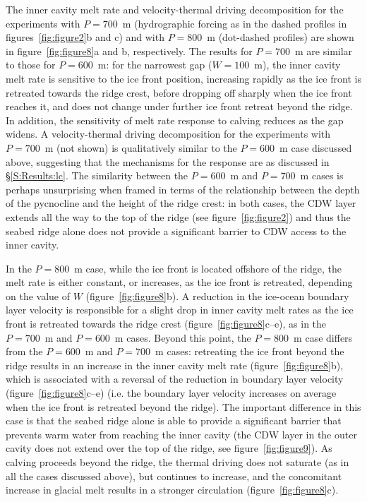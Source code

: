 \documentclass[draft]{agujournal2019}
\begin{document}
The inner cavity melt rate and velocity-thermal driving decomposition for the experiments with $P=700$~m (hydrographic forcing as in the dashed profiles in figures~\ref{fig:figure2}b and c) and with $P=800$~m (dot-dashed profiles) are shown in figure~\ref{fig:figure8}a and b, respectively. The results for $P=700$~m are similar to those for $P=600$~m: for the narrowest gap ($W=100$~m), the inner cavity melt rate is sensitive to the ice front position, increasing rapidly as the ice front is retreated towards the ridge crest, before dropping off sharply when the ice front reaches it, and does not change under further ice front retreat beyond the ridge. In addition, the sensitivity of melt rate response to calving reduces as the gap widens. A velocity-thermal driving decomposition for the experiments with $P=700$~m (not shown) is qualitatively similar to the $P=600$~m case discussed above, suggesting that the mechanisms for the response are as discussed in \S\ref{S:Results:lc}. The similarity between the $P=600$~m and $P=700$~m cases is perhaps unsurprising when framed in terms of the relationship between the depth of the pycnocline and the height of the ridge crest: in both cases, the CDW layer extends all the way to the top of the ridge (see figure~\ref{fig:figure2}) and thus the seabed ridge alone does not provide a significant barrier to CDW access to the inner cavity.

In the $P=800$~m case, while the ice front is located offshore of the ridge, the melt rate is either constant, or increases, as the ice front is retreated, depending on the value of $W$ (figure~\ref{fig:figure8}b). A reduction in the ice-ocean boundary layer velocity is responsible for a slight drop in inner cavity melt rates as the ice front is retreated towards the ridge crest (figure~\ref{fig:figure8}c--e), as in the $P=700$~m and $P=600$~m cases. Beyond this point, the $P=800$~m case differs from the $P = 600$~m and $P = 700$~m cases: retreating the ice front beyond the ridge results in an increase in the inner cavity melt rate (figure~\ref{fig:figure8}b), which is associated with a reversal of the reduction in boundary layer velocity (figure~\ref{fig:figure8}c--e) (i.e. the boundary layer velocity increases on average when the ice front is retreated beyond the ridge). The important difference in this case is that the seabed ridge alone is able to provide a significant barrier that prevents warm water from reaching the inner cavity (the CDW layer in the outer cavity does not extend over the top of the ridge, see figure~\ref{fig:figure9}). As calving proceeds beyond the ridge, the thermal driving does not saturate (as in all the cases discussed above), but continues to increase, and the concomitant increase in glacial melt results in a stronger circulation (figure~\ref{fig:figure8}c).
\end{document}
